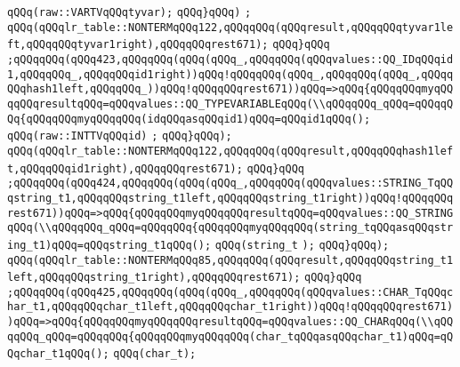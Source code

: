 \verb|qQQq(raw::VARTVqQQqtyvar);|\newline
\verb|qQQq}qQQq)|\newline
\verb|;|\newline
\verb|qQQq(qQQqlr_table::NONTERMqQQq122,qQQqqQQq(qQQqresult,qQQqqQQqtyvar1left,qQQqqQQqtyvar1right),qQQqqQQqrest671);|\newline
\verb|qQQq}qQQq|\newline
\verb|;qQQqqQQq(qQQq423,qQQqqQQq(qQQq(qQQq_,qQQqqQQq(qQQqvalues::QQ_IDqQQqid1,qQQqqQQq_,qQQqqQQqid1right))qQQq!qQQqqQQq(qQQq_,qQQqqQQq(qQQq_,qQQqqQQqhash1left,qQQqqQQq_))qQQq!qQQqqQQqrest671))qQQq=>qQQq{qQQqqQQqmyqQQqqQQqresultqQQq=qQQqvalues::QQ_TYPEVARIABLEqQQq(\\qQQqqQQq_qQQq=qQQqqQQq{qQQqqQQqmyqQQqqQQq(idqQQqasqQQqid1)qQQq=qQQqid1qQQq();|\newline
\verb|qQQq(raw::INTTVqQQqid)|\newline
\verb|;|\newline
\verb|qQQq}qQQq);|\newline
\verb|qQQq(qQQqlr_table::NONTERMqQQq122,qQQqqQQq(qQQqresult,qQQqqQQqhash1left,qQQqqQQqid1right),qQQqqQQqrest671);|\newline
\verb|qQQq}qQQq|\newline
\verb|;qQQqqQQq(qQQq424,qQQqqQQq(qQQq(qQQq_,qQQqqQQq(qQQqvalues::STRING_TqQQqstring_t1,qQQqqQQqstring_t1left,qQQqqQQqstring_t1right))qQQq!qQQqqQQqrest671))qQQq=>qQQq{qQQqqQQqmyqQQqqQQqresultqQQq=qQQqvalues::QQ_STRINGqQQq(\\qQQqqQQq_qQQq=qQQqqQQq{qQQqqQQqmyqQQqqQQq(string_tqQQqasqQQqstring_t1)qQQq=qQQqstring_t1qQQq();|\newline
\verb|qQQq(string_t|\newline
\verb|);|\newline
\verb|qQQq}qQQq);|\newline
\verb|qQQq(qQQqlr_table::NONTERMqQQq85,qQQqqQQq(qQQqresult,qQQqqQQqstring_t1left,qQQqqQQqstring_t1right),qQQqqQQqrest671);|\newline
\verb|qQQq}qQQq|\newline
\verb|;qQQqqQQq(qQQq425,qQQqqQQq(qQQq(qQQq_,qQQqqQQq(qQQqvalues::CHAR_TqQQqchar_t1,qQQqqQQqchar_t1left,qQQqqQQqchar_t1right))qQQq!qQQqqQQqrest671))qQQq=>qQQq{qQQqqQQqmyqQQqqQQqresultqQQq=qQQqvalues::QQ_CHARqQQq(\\qQQqqQQq_qQQq=qQQqqQQq{qQQqqQQqmyqQQqqQQq(char_tqQQqasqQQqchar_t1)qQQq=qQQqchar_t1qQQq();|\newline
\verb|qQQq(char_t);|\newline
